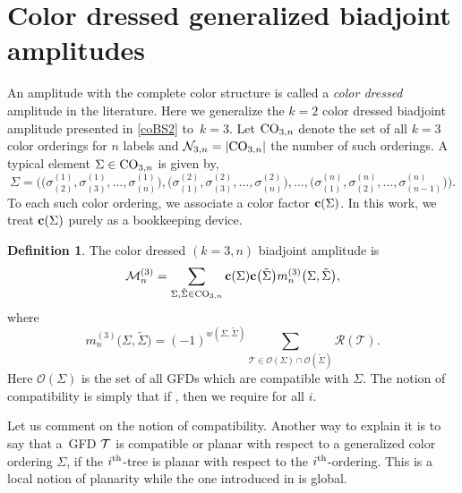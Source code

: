 \documentclass[pdftex]{sigma}
\theoremstyle{definition}
\newtheorem{defn}[thm]{Definition}
\numberwithin{equation}{section}
\begin{document}
\section{Color dressed generalized biadjoint amplitudes}\label{three}

An amplitude with the complete color structure is called a {\it color dressed} amplitude in the literature. Here we generalize the $k=2$ color dressed biadjoint amplitude presented in \eqref{coBS2} to~$k=3$. Let ${\rm CO}_{3,n}$ denote the set of all $k=3$ color orderings for $n$ labels and ${\cal N}_{3,n}=|{\rm CO}_{3,n}|$ the number of such orderings. A typical element $\Sigma \in {\rm CO}_{3,n}$ is given by,
\begin{equation*}
 \Sigma =\bigl(\bigl(\sigma^{(1)}_{(2)},\sigma^{(1)}_{(3)},\dots,\sigma^{(1)}_{(n)}\bigr),\bigl(\sigma^{(2)}_{(1)},\sigma^{(2)}_{(3)},\dots,\sigma^{(2)}_{(n)}\bigr),\dots ,\bigl(\sigma^{(n)}_{(1)},\sigma^{(n)}_{(2)},\dots,\sigma^{(n)}_{(n-1)}\bigr)\bigr).
\end{equation*}
To each such color ordering, we associate a color factor ${\bf c}(\Sigma)$. In this work, we treat ${\bf c}(\Sigma)$ purely as a bookkeeping device.

\begin{defn}\label{colorDressed}
The color dressed $(k=3,n)$ biadjoint amplitude is
%
\begin{equation}\label{coBS3Abs}
 {\mathcal M}^{(3)}_n = \sum_{\Sigma,\tilde{\Sigma}\in {\rm CO}_{3,n}} {\bf c}(\Sigma){\bf c}\big(\tilde\Sigma\big) m_n^{(3)}\big(\Sigma,\tilde\Sigma\big),
\end{equation}
%
where
%
\begin{equation*}
 m_n^{(3)}\big(\Sigma,\tilde\Sigma\big) = (-1)^{w(\Sigma,\tilde\Sigma )}\sum_{{\mathcal T}\in {\mathcal O}(\Sigma)\cap {\mathcal O}(\tilde\Sigma)} {\mathcal R}(\mathcal T).
\end{equation*}
%
Here ${\mathcal O}(\Sigma)$ is the set of all GFDs which are compatible with $\Sigma$. The notion of compatibility is simply that if , then we require  for all $i$.
\end{defn}

Let us comment on the notion of compatibility. Another way to explain it is to say that a~GFD ${\cal T}$ is compatible or planar with respect to a generalized color ordering $\Sigma$, if the $i^{\rm th}$-tree is planar with respect to the $i^{\rm th}$-ordering. This is a local notion of planarity while the one introduced in \cite{Borges:2019csl} is global.
\end{document}
